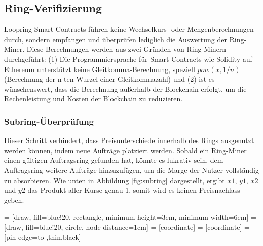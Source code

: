 \documentclass[UTF8,nofonts]{article}
\makeatletter
\newenvironment{figurehere}
 {\def\@captype{figure}}
 {}
\makeatother
\begin{document}
\begin{multicols}{2}
\subsection{Ring-Verifizierung\label{sec:ring_verification}}

Loopring Smart Contracts führen keine Wechselkurs- oder Mengenberechnungen durch, sondern empfangen und überprüfen lediglich die Auswertung der Ring-Miner. Diese Berechnungen werden aus zwei Gründen von Ring-Minern durchgeführt: (1) Die Programmiersprache für Smart Contracts wie Solidity \cite{dannen2017introducing} auf Ethereum unterstützt keine Gleitkomma-Berechnung, speziell $pow(x, 1/n)$ (Berechnung der n-ten Wurzel einer Gleitkommazahl) und (2) ist es wünschenswert, dass die Berechnung außerhalb der Blockchain erfolgt, um die Rechenleistung und Kosten der Blockchain zu reduzieren.

\subsubsection{Subring-Überprüfung\label{sec:sub_ring_check}}
Dieser Schritt verhindert, dass Preisunterschiede innerhalb des Rings ausgenutzt werden können, indem neue Aufträge platziert werden. Sobald ein Ring-Miner einen gültigen Auftragsring gefunden hat, könnte es lukrativ sein, dem Auftragsring weitere Aufträge hinzuzufügen, um die Marge der Nutzer vollständig zu absorbieren. Wie unten in Abbildung \ref{fig:subring} dargestellt, ergibt $x1$, $y1$, $x2$ und $y2$ das Produkt aller Kurse genau 1, somit wird es keinen Preisnachlass geben.

\begin{center}
\begin{figurehere}
\centering
{} = [draw, fill=blue!20, rectangle, 
    minimum height=3em, minimum width=6em]
 = [draw, fill=blue!20, circle, node distance=1cm]
 = [coordinate]
 = [coordinate]
 = [pin edge={to-,thin,black}]

\end{figurehere}
\end{center}
\end{multicols}
\end{document}
